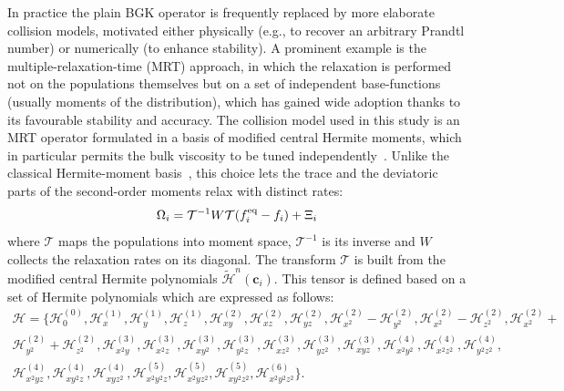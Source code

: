 In practice the plain BGK operator is frequently replaced by more elaborate collision models, motivated either physically (e.g., to recover an arbitrary Prandtl number) or numerically (to enhance stability). A prominent example is the multiple-relaxation-time (MRT) approach, in which the relaxation is performed not on the populations themselves but on a set of independent base-functions (usually moments of the distribution), which has gained wide adoption thanks to its favourable stability and accuracy. The collision model used in this study is an MRT operator formulated in a basis of modified central Hermite moments, which in particular permits the bulk viscosity to be tuned independently~\cite{hosseini2022lattice}. Unlike the classical Hermite-moment basis~\cite{hosseini2021central,huang2022simulation}, this choice lets the trace and the deviatoric parts of the second-order moments relax with distinct rates:
\begin{equation}
    \Omega_i = \mathcal{T}^{-1}W\mathcal{T}(f^{\rm eq}_i - f_i) + \Xi_i\label{eq:correc1}
\end{equation}
where $\mathcal{T}$ maps the populations into moment space, $\mathcal{T}^{-1}$ is its inverse and $W$ collects the relaxation rates on its diagonal. The transform $\mathcal{T}$ is built from the modified central Hermite polynomials $\widetilde{\mathcal{H}}^n(\bm{c}_i)$. This tensor is defined based on a set of Hermite polynomials which are expressed as follows:
\begin{equation}
\begin{matrix}
 \mathcal{H} = \{\mathcal{H}_0^{(0)}, \mathcal{H}_x^{(1)}, \mathcal{H}_y^{(1)}, \mathcal{H}_z^{(1)}, \mathcal{H}_{xy}^{(2)}, \mathcal{H}_{xz}^{(2)}, \mathcal{H}_{yz}^{(2)}, \mathcal{H}_{x^2}^{(2)}-\mathcal{H}_{y^2}^{(2)}, \mathcal{H}_{x^2}^{(2)}-\mathcal{H}_{z^2}^{(2)},\mathcal{H}_{x^2}^{(2)}+\\\mathcal{H}_{y^2}^{(2)} +\mathcal{H}_{z^2}^{(2)}, \mathcal{H}_{x^2y}^{(3)},
 \mathcal{H}_{x^2z}^{(3)},\mathcal{H}_{xy^2}^{(3)},\mathcal{H}_{y^2z}^{(3)}, \mathcal{H}_{xz^2}^{(3)},\mathcal{H}_{yz^2}^{(3)},
\mathcal{H}_{xyz}^{(3)}, \mathcal{H}_{x^2y^2}^{(4)}, \mathcal{H}_{x^2z^2}^{(4)}, \mathcal{H}_{y^2z^2}^{(4)},\\  \mathcal{H}_{x^2yz}^{(4)},  \mathcal{H}_{xy^2z}^{(4)}, \mathcal{H}_{xyz^2}^{(4)},\mathcal{H}_{x^2y^2z}^{(5)},  \mathcal{H}_{x^2yz^2}^{(5)}, \mathcal{H}_{xy^2z^2}^{(5)}, \mathcal{H}_{x^2y^2z^2}^{(6)} \}.
\end{matrix}
\label{Eq:LBM-3dh}
\end{equation}
